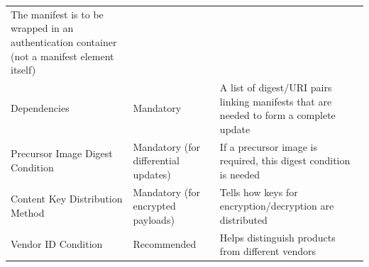 \documentclass[0-thesis.tex]{subfiles}
\begin{document}
\begin{longtable}[]{@{}lll@{}}
\begin{minipage}[t]{0.42\columnwidth}
    The manifest is to be wrapped in an authentication container (not a
    manifest element itself)\strut
    \end{minipage}\tabularnewline
    \begin{minipage}[t]{0.23\columnwidth}\raggedright\strut
    Dependencies\strut
    \end{minipage} & \begin{minipage}[t]{0.26\columnwidth}\raggedright\strut
    Mandatory\strut
    \end{minipage} & \begin{minipage}[t]{0.42\columnwidth}\raggedright\strut
    A list of digest/URI pairs linking manifests that are needed to form a
    complete update\strut
    \end{minipage}\tabularnewline
    \begin{minipage}[t]{0.23\columnwidth}\raggedright\strut
    Precursor Image Digest Condition\strut
    \end{minipage} & \begin{minipage}[t]{0.26\columnwidth}\raggedright\strut
    Mandatory (for differential updates)\strut
    \end{minipage} & \begin{minipage}[t]{0.42\columnwidth}\raggedright\strut
    If a precursor image is required, this digest condition is needed\strut
    \end{minipage}\tabularnewline
    \begin{minipage}[t]{0.23\columnwidth}\raggedright\strut
    Content Key Distribution Method\strut
    \end{minipage} & \begin{minipage}[t]{0.26\columnwidth}\raggedright\strut
    Mandatory (for encrypted payloads)\strut
    \end{minipage} & \begin{minipage}[t]{0.42\columnwidth}\raggedright\strut
    Tells how keys for encryption/decryption are distributed\strut
    \end{minipage}\tabularnewline
    \begin{minipage}[t]{0.23\columnwidth}\raggedright\strut
    Vendor ID Condition\strut
    \end{minipage} & \begin{minipage}[t]{0.26\columnwidth}\raggedright\strut
    Recommended\strut
    \end{minipage} & \begin{minipage}[t]{0.42\columnwidth}\raggedright\strut
    Helps distinguish products from different vendors\strut

\end{minipage}
\end{longtable}
\end{document}
